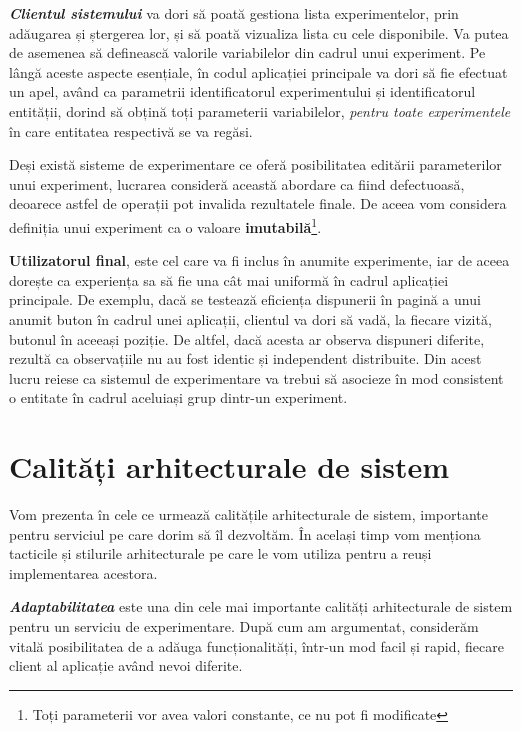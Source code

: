 \textbf{\textit{Clientul sistemului}} va dori să poată gestiona lista experimentelor, prin adăugarea și ștergerea lor, și să poată vizualiza lista cu cele disponibile. Va putea de asemenea să definească valorile variabilelor din cadrul unui experiment. Pe lângă aceste aspecte esențiale, în codul aplicației principale va dori să fie efectuat un apel, având ca parametrii identificatorul experimentului și identificatorul entității, dorind să obțină toți parameterii variabilelor, \textit{pentru toate experimentele} în care entitatea respectivă se va regăsi.

\begin{remark}
	\label{remark:no_edit_exp}
	Deși există sisteme de experimentare ce oferă posibilitatea editării parameterilor unui experiment, lucrarea consideră această abordare ca fiind defectuoasă, deoarece astfel de operații pot invalida rezultatele finale. De aceea vom considera definiția unui experiment ca o valoare \textbf{imutabilă}\footnote{Toți parameterii vor avea valori constante, ce nu pot fi modificate}. 
\end{remark}

\textbf{\textbf{Utilizatorul final}}, este cel care va fi inclus în anumite experimente, iar de aceea dorește ca experiența sa să fie una cât mai uniformă în cadrul aplicației principale. De exemplu, dacă se testează eficiența dispunerii în pagină a unui anumit buton în cadrul unei aplicații, clientul va dori să vadă, la fiecare vizită, butonul în aceeași poziție. De altfel, dacă acesta ar observa dispuneri diferite, rezultă ca observațiile nu au fost identic și independent distribuite. Din acest lucru reiese ca sistemul de experimentare va trebui să asocieze în mod consistent o entitate în cadrul aceluiași grup dintr-un experiment. 

\section{Calități arhitecturale de sistem}

Vom prezenta în cele ce urmează calitățile arhitecturale de sistem, importante pentru serviciul pe care dorim să îl dezvoltăm. În același timp vom menționa tacticile și stilurile arhitecturale pe care le vom utiliza pentru a reuși implementarea acestora.

\textbf{\textit{Adaptabilitatea}} este una din cele mai importante calități arhitecturale de sistem pentru un serviciu de experimentare. După cum am argumentat, considerăm vitală posibilitatea de a adăuga funcționalități, într-un mod facil și rapid, fiecare client al aplicație având nevoi diferite.

